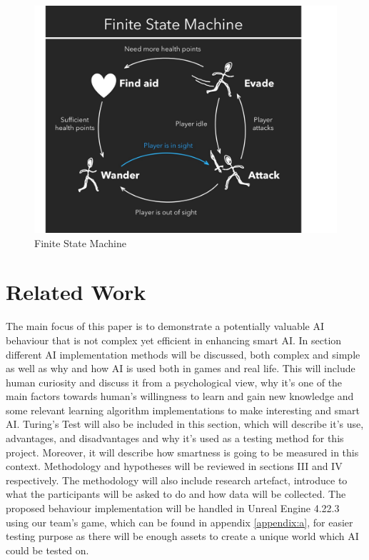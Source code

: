 \documentclass[journal]{IEEEtran}
\begin{document}
\begin{figure}
	\includegraphics[width=\linewidth]{Images/FSM.jpg}
	\caption{Finite State Machine \cite{lou2017}}
	\label{fig:fsm}
\end{figure}

\section{Related Work} %
The main focus of this paper is to demonstrate a potentially valuable AI behaviour that is not complex yet efficient in enhancing smart AI. In section different AI implementation methods will be discussed, both complex and simple as well as why and how AI is used both in games and real life. This will include human curiosity and discuss it from a psychological view, why it's one of the main factors towards human's willingness to learn and gain new knowledge and some relevant learning algorithm implementations to make interesting and smart AI. Turing's Test will also be included in this section, which will describe it's use, advantages, and disadvantages and why it's used as a testing method for this project. Moreover, it will describe how smartness is going to be measured in this context. Methodology and hypotheses will be reviewed in sections III and IV respectively. The methodology will also include research artefact, introduce to what the participants will be asked to do and how data will be collected. The proposed behaviour implementation will be handled in Unreal Engine 4.22.3 using our team's game, which can be found in appendix \ref{appendix:a}, for easier testing purpose as there will be enough assets to create a unique world which AI could be tested on.
\end{document}
